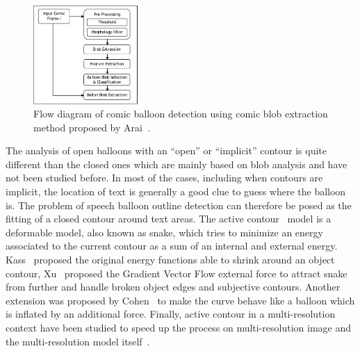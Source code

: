  \begin{figure}[!ht]  %
   \centering
  \includegraphics[trim= 0px 0px 0px 0px, clip, width=150px]{Arai_balloon_extraction_process.pdf}
  \caption[Flow diagram of comic balloon detection]{Flow diagram of comic balloon detection using comic blob extraction method proposed by Arai~\cite{Arai11}.}
  \label{fig:Arai_balloon_extraction_process}
 \end{figure}

The analysis of open balloons with an ``open'' or ``implicit'' contour is quite different than the closed ones which are mainly based on blob analysis and have not been studied before.
In most of the cases, including when contours are implicit, the location of text is generally a good clue to guess where the balloon is.
The problem of speech balloon outline detection can therefore be posed as the fitting of a closed contour around text areas.
The active contour~\cite{Kass1988} model is a deformable model, also known as snake, which tries to minimize an energy associated to the current contour as a sum of an internal and external energy.
Kass~\cite{Kass1988} proposed the original energy functions able to shrink around an object contour, Xu~\cite{Xu1998} proposed the Gradient Vector Flow external force to attract snake from further and handle broken object edges and subjective contours.
Another extension was proposed by Cohen~\cite{Cohen1991} to make the curve behave like a balloon which is inflated by an additional force.
Finally, active contour in a multi-resolution context have been studied to speed up the process on multi-resolution image and the multi-resolution model itself~\cite{Leroy1996}.

